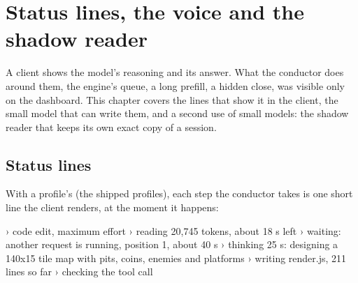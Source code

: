 \chapter{Status lines, the voice and the shadow reader}\label{ch:lines}

A client shows the model's reasoning and its answer. What the conductor does around them, the engine's queue, a long prefill, a hidden close, was visible only on the dashboard. This chapter covers the lines that show it in the client, the small model that can write them, and a second use of small models: the shadow reader that keeps its own exact copy of a session.

\section{Status lines}

With a profile's  (the shipped profiles), each step the conductor takes is one short line the client renders, at the moment it happens:

\begin{lines}
› code edit, maximum effort
› reading 20,745 tokens, about 18 s left
› waiting: another request is running, position 1, about 40 s
› thinking 25 s: designing a 140x15 tile map with pits, coins, enemies and platforms
› writing render.js, 211 lines so far
› checking the tool call
\end{lines}

